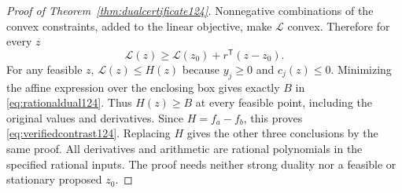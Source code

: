 \begin{proof}[Proof of Theorem~\ref{thm:dualcertificate124}]
Nonnegative combinations of the convex constraints, added to the
linear objective, make $\mathcal L$ convex. Therefore for every $z$
\[
 \mathcal L(z)\ge\mathcal L(z_0)+r^{\mathsf T}(z-z_0).
\]
For any feasible $z$, $\mathcal L(z)\le H(z)$ because
$y_j\ge0$ and $c_j(z)\le0$. Minimizing the affine expression
over the enclosing box gives exactly $B$ in
\eqref{eq:rationaldual124}. Thus $H(z)\ge B$ at every feasible
point, including the original values and derivatives. Since
$H=f_a-f_b$, this proves \eqref{eq:verifiedcontrast124}.
Replacing $H$ gives the other three conclusions by the same proof.
All derivatives and arithmetic are rational polynomials in the
specified rational inputs. The proof needs neither strong duality nor
a feasible or stationary proposed $z_0$.
\end{proof}

